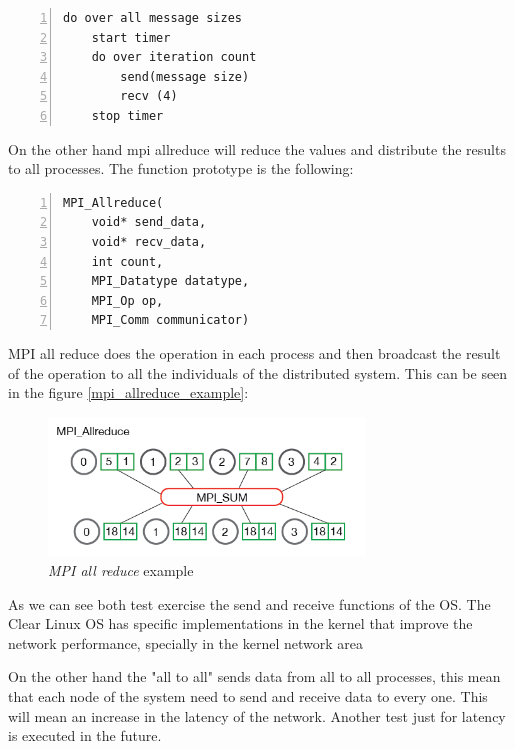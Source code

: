 \begin{lstlisting}[frame=single,numbers=left]
do over all message sizes 
    start timer
    do over iteration count 
        send(message size) 
        recv (4)
    stop timer
\end{lstlisting}

On the other hand mpi allreduce will reduce the values and distribute the
results to all processes. The function prototype is the following:

\begin{lstlisting}[frame=single,numbers=left]
MPI_Allreduce(
    void* send_data,
    void* recv_data,
    int count,
    MPI_Datatype datatype,
    MPI_Op op,
    MPI_Comm communicator)
\end{lstlisting}

MPI all reduce does the operation in each process and then broadcast the result
of the operation to all the individuals of the distributed system. This can be
seen in the figure \ref{mpi_allreduce_example}: 

\begin{figure}[H]
\centering
\includegraphics[width=0.75\textwidth]{images/mpi_allreduce_1.png}
\caption{\textit{MPI all reduce} example }
\label{Mpi_allreduce_example}
\end{figure}

As we can see both test exercise the send and receive functions of the OS. The
Clear Linux OS has specific implementations in the kernel that improve the
network performance, specially in the kernel network area

On the other hand the "all to all" sends data from all to all processes, this
mean that each node of the system need to send and receive data to every one.
This will mean an increase in the latency of the network. Another test just for
latency is executed in the future. 


